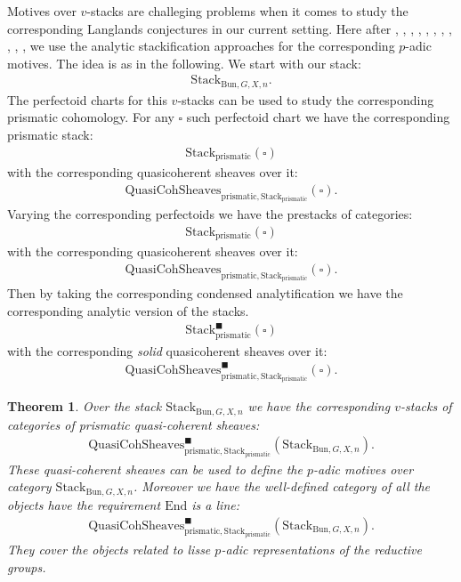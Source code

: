 \documentclass[12pt]{article}
\newtheorem{theorem}{Theorem}
\theoremstyle{definition}
\begin{document}
Motives over $v$-stacks are challeging problems when it comes to study the corresponding Langlands conjectures in our current setting. Here after \cite{CSA}, \cite{CSB}, \cite{CSC}, \cite{SchD}, \cite{SALBRC}, \cite{TA}, \cite{TB}, \cite{TC}, \cite{BBBK}, \cite{BS2}, \cite{BLA}, \cite{DC} we use the analytic stackification approaches for the corresponding $p$-adic motives. The idea is as in the following. We start with our stack:
\begin{align}
\mathrm{Stack}_{\mathrm{Bun},G,X,n}.
\end{align}
The perfectoid charts for this $v$-stacks can be used to study the corresponding prismatic cohomology. For any $\square$ such perfectoid chart we have the corresponding prismatic stack:
\begin{align}
\mathrm{Stack}_{\mathrm{prismatic}}(\square)
\end{align}
with the corresponding quasicoherent sheaves over it:
\begin{align}
\mathrm{QuasiCohSheaves}_{\mathrm{prismatic},\mathrm{Stack}_{\mathrm{prismatic}}}(\square).
\end{align}
Varying the corresponding perfectoids we have the prestacks of categories:
\begin{align}
\mathrm{Stack}_{\mathrm{prismatic}}(\square)
\end{align}
with the corresponding quasicoherent sheaves over it:
\begin{align}
\mathrm{QuasiCohSheaves}_{\mathrm{prismatic},\mathrm{Stack}_{\mathrm{prismatic}}}(\square).
\end{align}
Then by taking the corresponding condensed analytification we have the corresponding analytic version of the stacks.
\begin{align}
\mathrm{Stack}^\blacksquare_{\mathrm{prismatic}}(\square)
\end{align}
with the corresponding \textit{solid} quasicoherent sheaves over it:
\begin{align}
\mathrm{QuasiCohSheaves}^\blacksquare_{\mathrm{prismatic},\mathrm{Stack}_{\mathrm{prismatic}}}(\square).
\end{align}

\begin{theorem}
Over the stack $\mathrm{Stack}_{\mathrm{Bun},G,X,n}$ we have the corresponding $v$-stacks of categories of prismatic quasi-coherent sheaves:
\begin{align}
\mathrm{QuasiCohSheaves}^\blacksquare_{\mathrm{prismatic},\mathrm{Stack}_{\mathrm{prismatic}}}(\mathrm{Stack}_{\mathrm{Bun},G,X,n}).
\end{align}
These quasi-coherent sheaves can be used to define the $p$-adic motives over category $\mathrm{Stack}_{\mathrm{Bun},G,X,n}$. Moreover we have the well-defined category of all the objects have the requirement $\mathrm{End}$ is a line:
\begin{align}
\mathrm{QuasiCohSheaves}^\blacksquare_{\mathrm{prismatic},\mathrm{Stack}_{\mathrm{prismatic}}}(\mathrm{Stack}_{\mathrm{Bun},G,X,n}).
\end{align}
They cover the objects related to lisse $p$-adic representations of the reductive groups.
\end{theorem}
\end{document}
